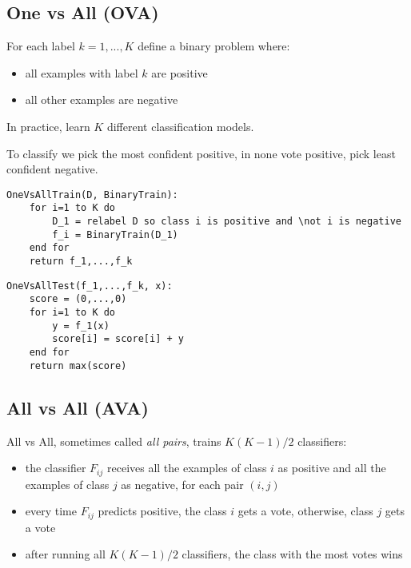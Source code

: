 \documentclass[11pt]{article}
\begin{document}
\subsection{One vs All (OVA)}\label{one-vs-all-ova}

For each label \(k=1, ..., K\) define a binary problem where:

\begin{itemize}
\tightlist
\item
  all examples with label \(k\) are positive
\item
  all other examples are negative
\end{itemize}

In practice, learn \(K\) different classification models.

To classify we pick the most confident positive, in none vote positive,
pick least confident negative.

\begin{verbatim}
OneVsAllTrain(D, BinaryTrain):
    for i=1 to K do
        D_1 = relabel D so class i is positive and \not i is negative
        f_i = BinaryTrain(D_1)
    end for
    return f_1,...,f_k 
\end{verbatim}

\begin{verbatim}
OneVsAllTest(f_1,...,f_k, x):
    score = (0,...,0)
    for i=1 to K do
        y = f_1(x)
        score[i] = score[i] + y
    end for
    return max(score)
\end{verbatim}

\subsection{All vs All (AVA)}\label{all-vs-all-ava}

All vs All, sometimes called \emph{all pairs}, trains \(K(K-1)/2\)
classifiers:

\begin{itemize}
\tightlist
\item
  the classifier \(F_{ij}\) receives all the examples of class \(i\) as
  positive and all the examples of class \(j\) as negative, for each
  pair \((i, j)\)
\item
  every time \(F_{ij}\) predicts positive, the class \(i\) gets a vote,
  otherwise, class \(j\) gets a vote
\item
  after running all \(K(K-1)/2\) classifiers, the class with the most
  votes wins
\end{itemize}
\end{document}
